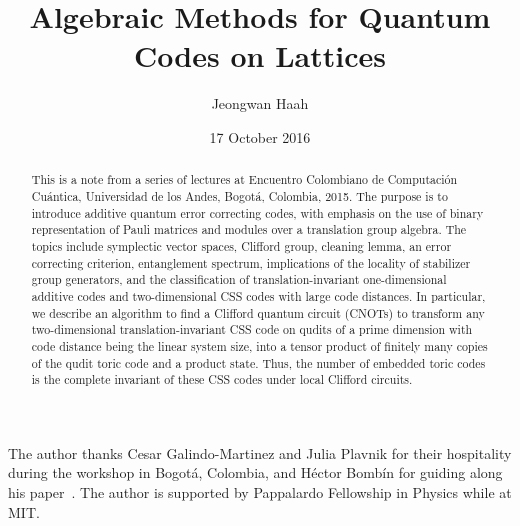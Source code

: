 \documentclass[letterpaper, 11pt,nofootinbib,aps,pra,longbibliography]{revtex4-1}
\theoremstyle{definition}
\theoremstyle{plain}
\begin{document}
\title{Algebraic Methods for Quantum Codes on Lattices}
\author{Jeongwan Haah}
\date{17 October 2016}


\begin{abstract}
This is a note from a series of lectures
at Encuentro Colombiano de Computaci\'on Cu\'antica, 
Universidad de los Andes, Bogot\'a, Colombia, 2015.
The purpose is to introduce additive quantum error correcting codes,
with emphasis on the use of binary representation of Pauli matrices
and modules over a translation group algebra.
The topics include symplectic vector spaces,
Clifford group, cleaning lemma,
an error correcting criterion,
entanglement spectrum,
implications of the locality of stabilizer group generators,
and 
the classification of translation-invariant one-dimensional additive codes
and two-dimensional CSS codes with large code distances.
In particular,
we describe an algorithm to find a Clifford quantum circuit (CNOTs)
to transform any two-dimensional translation-invariant
CSS code on qudits of a prime dimension with code distance being the linear system size,
into a tensor product of finitely many copies of the qudit toric code and a product state.
Thus, the number of embedded toric codes is the complete invariant of these CSS codes
under local Clifford circuits.
\end{abstract}

\maketitle
\tableofcontents



\begin{acknowledgments}
The author thanks 
Cesar Galindo-Martinez and Julia Plavnik
for their hospitality during the workshop in Bogot\'a, Colombia,
and H\'ector Bomb\'in for guiding along his paper~\cite{Bombin2011Structure}.
The author is supported by Pappalardo Fellowship in Physics while at MIT.
\end{acknowledgments}


%
\end{document}
